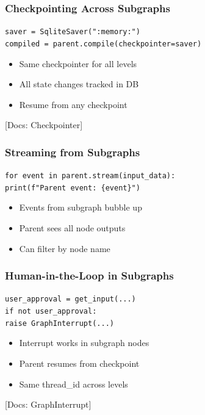 \documentclass[aspectratio=169,11pt]{beamer}
\newcommand{\docref}[1]{{\scriptsize\color{docgray}[Docs: #1]}}
\begin{document}
\begin{frame}
\frametitle{Checkpointing Across Subgraphs}
\begin{tipbox}
\texttt{saver = SqliteSaver(":memory:")}\\
\texttt{compiled = parent.compile(checkpointer=saver)}
\end{tipbox}
\vspace{0.1cm}
\begin{tipbox}
\setlength{\itemsep}{1pt}
\begin{itemize}
\item Same checkpointer for all levels
\item All state changes tracked in DB
\item Resume from any checkpoint
\end{itemize}
\end{tipbox}
\docref{Checkpointer}
\end{frame}

\begin{frame}
\frametitle{Streaming from Subgraphs}
\begin{tipbox}
\texttt{for event in parent.stream(input\_data):}\\
\texttt{print(f"Parent event: \{event\}")}
\end{tipbox}
\vspace{0.1cm}
\begin{tipbox}[Behavior]
\setlength{\itemsep}{1pt}
\begin{itemize}
\item Events from subgraph bubble up
\item Parent sees all node outputs
\item Can filter by node name
\end{itemize}
\end{tipbox}
\end{frame}

\begin{frame}
\frametitle{Human-in-the-Loop in Subgraphs}
\begin{tipbox}
\texttt{user\_approval = get\_input(...)}\\
\texttt{if not user\_approval:}\\
\texttt{raise GraphInterrupt(...)}
\end{tipbox}
\vspace{0.1cm}
\begin{tipbox}[Integration]
\setlength{\itemsep}{1pt}
\begin{itemize}
\item Interrupt works in subgraph nodes
\item Parent resumes from checkpoint
\item Same thread\_id across levels
\end{itemize}
\end{tipbox}
\docref{GraphInterrupt}
\end{frame}
\end{document}
